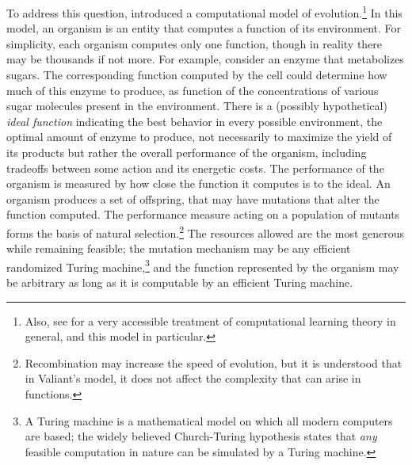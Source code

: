 \documentclass{acmtr2e}
\begin{document}
To address this question,  introduced a
computational model of evolution.\footnote{Also, see
 for a very accessible treatment of computational
learning theory in general, and this model in particular.} In this model, an
organism is an entity that computes a function of its environment. For
simplicity, each organism computes only one function, though in reality there
may be thousands if not more.
For example, consider an enzyme that metabolizes sugars.
The corresponding function computed by the cell could determine how much of
this enzyme to produce, as function of the concentrations of various sugar
molecules present in the environment.
There is a (possibly hypothetical) \emph{ideal
function} indicating the best behavior in every possible environment,
\eg the optimal amount of enzyme to produce, not necessarily to maximize the
yield of its products but rather the overall performance of the organism,
including tradeoffs between some action and its energetic costs. The
performance of the organism is measured by how close the function it computes is
to the ideal. An organism produces a set of offspring, that may have mutations
that  alter the function computed. The performance measure acting on a
population of mutants forms the basis of natural
selection.\footnote{Recombination may increase the speed of evolution, but it is
understood that in Valiant's model, it does not affect the complexity that can
arise in functions.} The resources allowed are the most generous while remaining
feasible; the mutation mechanism may be any efficient randomized Turing
machine,\footnote{A Turing machine is a mathematical model on which all modern
computers are based; the widely believed Church-Turing hypothesis states that
\emph{any} feasible computation in nature can be simulated by a Turing machine.}
and the function represented by the organism may be arbitrary as long as it is
computable by an efficient Turing machine.
\end{document}
